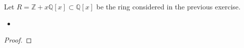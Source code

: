\documentclass[10pt]{article}
\newenvironment{problem}[2][Problem]{\begin{trivlist}
		\item[\hskip \labelsep {\bfseries #1}\hskip \labelsep {\bfseries #2.}]}{\end{trivlist}}
\begin{document}
	\begin{problem}{3.5}
		Let $R=\mathbb{Z} + x\mathbb{Q}[x] \subset \mathbb{Q}[x]$ be the ring considered in the previous exercise.
		\begin{itemize}
			\item[\textbf{(a)}]
		\end{itemize} 
		\begin{proof}
			
		\end{proof}
	\end{problem}
\end{document}
